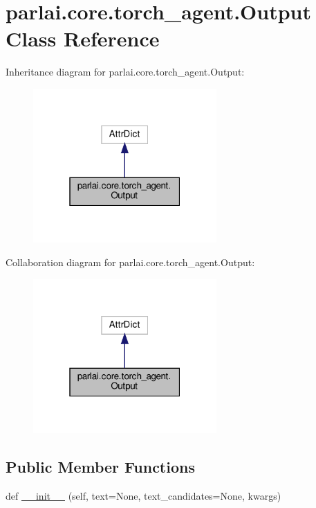 \hypertarget{classparlai_1_1core_1_1torch__agent_1_1Output}{}\section{parlai.\+core.\+torch\+\_\+agent.\+Output Class Reference}
\label{classparlai_1_1core_1_1torch__agent_1_1Output}


Inheritance diagram for parlai.\+core.\+torch\+\_\+agent.\+Output\+:
\nopagebreak
\begin{figure}[H]
\begin{center}
\leavevmode
\includegraphics[width=199pt]{dc/d0d/classparlai_1_1core_1_1torch__agent_1_1Output__inherit__graph}
\end{center}
\end{figure}


Collaboration diagram for parlai.\+core.\+torch\+\_\+agent.\+Output\+:
\nopagebreak
\begin{figure}[H]
\begin{center}
\leavevmode
\includegraphics[width=199pt]{de/d88/classparlai_1_1core_1_1torch__agent_1_1Output__coll__graph}
\end{center}
\end{figure}
\subsection*{Public Member Functions}
\begin{DoxyCompactItemize}
\item 
def \hyperlink{classparlai_1_1core_1_1torch__agent_1_1Output_a490f5e29040c643f20b63c23e7359627}{\+\_\+\+\_\+init\+\_\+\+\_\+} (self, text=None, text\+\_\+candidates=None, kwargs)
\end{DoxyCompactItemize}


